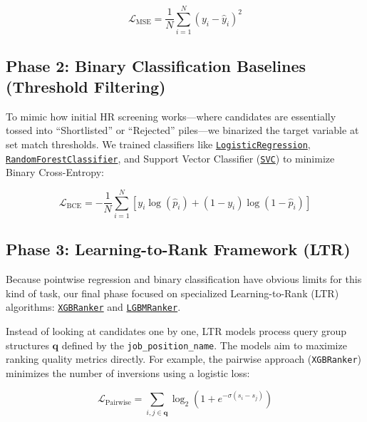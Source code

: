 \documentclass[12pt,a4paper,oneside]{report}
\begin{document}
\begin{equation}
\mathcal{L}_{\text{MSE}} = \frac{1}{N}\sum_{i=1}^{N} (y_i - \hat{y}_i)^2
\end{equation}

\subsection{Phase 2: Binary Classification Baselines (Threshold Filtering)}
To mimic how initial HR screening works—where candidates are essentially tossed into ``Shortlisted'' or ``Rejected'' piles—we binarized the target variable at set match thresholds. We trained classifiers like \href{https://scikit-learn.org/stable/modules/generated/sklearn.linear_model.LogisticRegression.html}{\texttt{LogisticRegression}}, \href{https://scikit-learn.org/stable/modules/generated/sklearn.ensemble.RandomForestClassifier.html}{\texttt{RandomForestClassifier}}, and Support Vector Classifier (\href{https://scikit-learn.org/stable/modules/generated/sklearn.svm.SVC.html}{\texttt{SVC}}) to minimize Binary Cross-Entropy:

\begin{equation}
\mathcal{L}_{\text{BCE}} = -\frac{1}{N}\sum_{i=1}^{N} \left[ y_i \log(\hat{p}_i) + (1 - y_i) \log(1 - \hat{p}_i) \right]
\end{equation}

\subsection{Phase 3: Learning-to-Rank Framework (LTR)}
Because pointwise regression and binary classification have obvious limits for this kind of task, our final phase focused on specialized Learning-to-Rank (LTR) algorithms: \href{https://xgboost.readthedocs.io/en/stable/python/python_api.html#xgboost.XGBRanker}{\texttt{XGBRanker}} and \href{https://lightgbm.readthedocs.io/en/stable/pythonapi/lightgbm.LGBMRanker.html}{\texttt{LGBMRanker}}. 

Instead of looking at candidates one by one, LTR models process query group structures $\mathbf{q}$ defined by the \texttt{job\_position\_name}. The models aim to maximize ranking quality metrics directly. For example, the pairwise approach (\texttt{XGBRanker}) minimizes the number of inversions using a logistic loss:

\begin{equation}
\mathcal{L}_{\text{Pairwise}} = \sum_{i, j \in \mathbf{q}} \log_2 \left( 1 + e^{-\sigma (s_i - s_j)} \right)
\end{equation}
\end{document}
